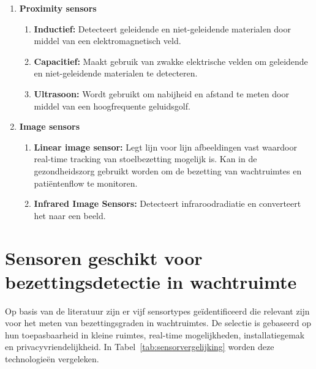 \begin{enumerate}
    
    \item \textbf{Proximity sensors}
    \begin{enumerate}
        \item \textbf{Inductief:} Detecteert geleidende en niet-geleidende materialen door middel van een elektromagnetisch veld.
        \item \textbf{Capacitief:} Maakt gebruik van zwakke elektrische velden om geleidende en niet-geleidende materialen te detecteren.
        \item \textbf{Ultrasoon:} Wordt gebruikt om nabijheid en afstand te meten door middel van een hoogfrequente geluidsgolf.
    \end{enumerate}
    
    \item \textbf{Image sensors}
    \begin{enumerate}
        \item \textbf{Linear image sensor:} Legt lijn voor lijn afbeeldingen vast waardoor real-time tracking van stoelbezetting mogelijk is. Kan in de gezondheidszorg gebruikt worden om de bezetting van wachtruimtes en patiëntenflow te monitoren.
        \item \textbf{Infrared Image Sensors:} Detecteert infraroodradiatie en converteert het naar een beeld.
    \end{enumerate}
\end{enumerate}


\section{Sensoren geschikt voor bezettingsdetectie in wachtruimte}
Op basis van de literatuur zijn er vijf sensortypes geïdentificeerd die relevant zijn voor het meten van bezettingsgraden in wachtruimtes. De selectie is gebaseerd op hun toepasbaarheid in kleine ruimtes, real-time mogelijkheden, installatiegemak en privacyvriendelijkheid. In Tabel~\ref{tab:sensorvergelijking} worden deze technologieën vergeleken.

